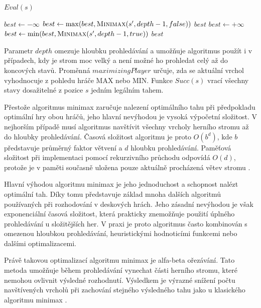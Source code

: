 \begin{algorithm}[H]
\caption{Algoritmus minimax}
\label{alg:minimax}
\begin{algorithmic}[1]
        \State \Return $Eval(s)$
    \EndIf

        \State $best \gets -\infty$
            \State $best \gets \max(best, \Call{Minimax}{s', depth - 1, false})$
        \EndFor
        \State \Return $best$
    \Else
        \State $best \gets +\infty$
            \State $best \gets \min(best, \Call{Minimax}{s', depth - 1, true})$
        \EndFor
        \State \Return $best$
    \EndIf
\EndFunction
\end{algorithmic}
\end{algorithm}

Parametr $depth$ omezuje hloubku prohledávání a umožňuje algoritmus použít i v případech, kdy je strom moc velký a  není možné ho prohledat celý
až do koncových stavů. Proměnná $maximizingPlayer$ určuje, zda se aktuální vrchol vyhodnocuje z pohledu hráče MAX nebo MIN. Funkce 
$Succ(s)$ vrací všechny stavy dosažitelné z pozice $s$ jedním legálním tahem.

Přestože algoritmus minimax zaručuje nalezení optimálního tahu při předpokladu optimální hry obou hráčů, jeho hlavní nevýhodou je vysoká výpočetní
složitost. V nejhorším případě musí algoritmus navštívit všechny vrcholy herního stromu až do hloubky prohledávání. Časová složitost algoritmu
je proto $O(b^d)$, kde $b$ představuje průměrný faktor větvení a $d$ hloubku prohledávání. Paměťová složitost při implementaci pomocí rekurzivního průchodu 
odpovídá $O(d)$, protože je v paměti současně uložena pouze aktuálně procházená větev stromu \cite{russell2021aima}.

Hlavní výhodou algoritmu minimax je jeho jednoduchost a schopnost nalézt optimální tah. 
Díky tomu představuje základ mnoha dalších algoritmů používaných při rozhodování v deskových hrách. Jeho zásadní nevýhodou je však 
exponenciální časová složitost, která prakticky znemožňuje použití úplného prohledávání u složitějších her. V praxi je proto algoritmus 
často kombinován s omezenou hloubkou prohledávání, heuristickými hodnoticími funkcemi nebo dalšími optimalizacemi.

Právě takovou optimalizací algoritmu minimax je alfa-beta ořezávání. Tato metoda umožňuje během prohledávání vynechat 
části herního stromu, které nemohou ovlivnit výsledné rozhodnutí. Výsledkem je výrazné snížení počtu navštívených vrcholů při 
zachování stejného výsledného tahu jako u klasického algoritmu minimax \cite{russell2021aima}.


